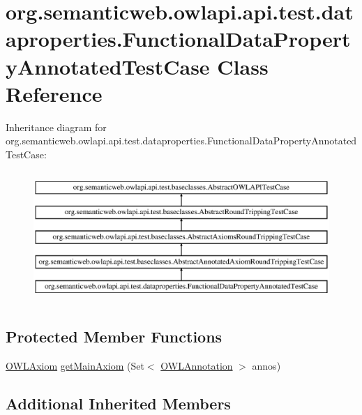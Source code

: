 \hypertarget{classorg_1_1semanticweb_1_1owlapi_1_1api_1_1test_1_1dataproperties_1_1_functional_data_property_annotated_test_case}{\section{org.\-semanticweb.\-owlapi.\-api.\-test.\-dataproperties.\-Functional\-Data\-Property\-Annotated\-Test\-Case Class Reference}
\label{classorg_1_1semanticweb_1_1owlapi_1_1api_1_1test_1_1dataproperties_1_1_functional_data_property_annotated_test_case}
}
Inheritance diagram for org.\-semanticweb.\-owlapi.\-api.\-test.\-dataproperties.\-Functional\-Data\-Property\-Annotated\-Test\-Case\-:\begin{figure}[H]
\begin{center}
\leavevmode
\includegraphics[height=5.000000cm]{classorg_1_1semanticweb_1_1owlapi_1_1api_1_1test_1_1dataproperties_1_1_functional_data_property_annotated_test_case}
\end{center}
\end{figure}
\subsection*{Protected Member Functions}
\begin{DoxyCompactItemize}
\item 
\hyperlink{interfaceorg_1_1semanticweb_1_1owlapi_1_1model_1_1_o_w_l_axiom}{O\-W\-L\-Axiom} \hyperlink{classorg_1_1semanticweb_1_1owlapi_1_1api_1_1test_1_1dataproperties_1_1_functional_data_property_annotated_test_case_a1c23c5610dfe5d7939a9643faef17ba4}{get\-Main\-Axiom} (Set$<$ \hyperlink{interfaceorg_1_1semanticweb_1_1owlapi_1_1model_1_1_o_w_l_annotation}{O\-W\-L\-Annotation} $>$ annos)
\end{DoxyCompactItemize}
\subsection*{Additional Inherited Members}


